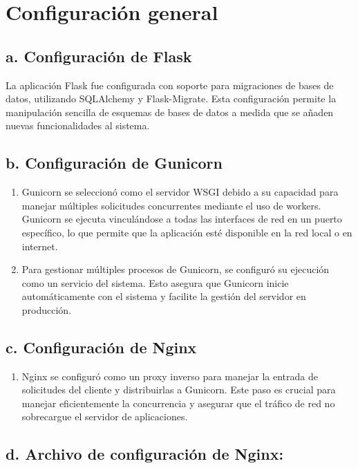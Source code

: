 \section*{Configuración general}

\subsection*{a. Configuración de Flask}
La aplicación Flask fue configurada con soporte para migraciones de bases de datos, utilizando SQLAlchemy y Flask-Migrate. Esta configuración permite la manipulación sencilla de esquemas de bases de datos a medida que se añaden nuevas funcionalidades al sistema.

\subsection*{b. Configuración de Gunicorn}
\begin{enumerate}[label=\roman*.]
    \item Gunicorn se seleccionó como el servidor WSGI debido a su capacidad para manejar múltiples solicitudes concurrentes mediante el uso de workers. Gunicorn se ejecuta vinculándose a todas las interfaces de red en un puerto específico, lo que permite que la aplicación esté disponible en la red local o en internet.
    \item Para gestionar múltiples procesos de Gunicorn, se configuró su ejecución como un servicio del sistema. Esto asegura que Gunicorn inicie automáticamente con el sistema y facilite la gestión del servidor en producción.
\end{enumerate}

\subsection*{c. Configuración de Nginx}
\begin{enumerate}[label=\roman*.]
    \item Nginx se configuró como un proxy inverso para manejar la entrada de solicitudes del cliente y distribuirlas a Gunicorn. Este paso es crucial para manejar eficientemente la concurrencia y asegurar que el tráfico de red no sobrecargue el servidor de aplicaciones.
\end{enumerate}

\subsection*{d. Archivo de configuración de Nginx:}

